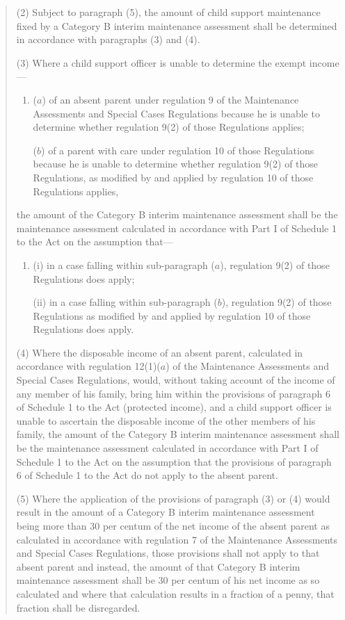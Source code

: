 \documentclass[12pt,a4paper]{article}
\begin{document}
\begin{quotation}
(2) Subject to paragraph (5), the amount of child support maintenance fixed by a Category B interim maintenance assessment shall be determined in accordance with paragraphs (3) and (4).

(3) Where a child support officer is unable to determine the exempt income—
\begin{enumerate}\item[]
($a$) of an absent parent under regulation 9 of the Maintenance Assessments and Special Cases Regulations because he is unable to determine whether regulation 9(2) of those Regulations applies;

($b$) of a parent with care under regulation 10 of those Regulations because he is unable to determine whether regulation 9(2) of those Regulations, as modified by and applied by regulation 10 of those Regulations applies,
\end{enumerate}
the amount of the Category B interim maintenance assessment shall be the maintenance assessment calculated in accordance with Part I of Schedule 1 to the Act on the assumption that—
\begin{enumerate}\item[]
(i) in a case falling within sub-paragraph ($a$), regulation 9(2) of those Regulations does apply;

(ii) in a case falling within sub-paragraph ($b$), regulation 9(2) of those Regulations as modified by and applied by regulation 10 of those Regulations does apply.
\end{enumerate}

(4) Where the disposable income of an absent parent, calculated in accordance with regulation 12(1)($a$) of the Maintenance Assessments and Special Cases Regulations, would, without taking account of the income of any member of his family, bring him within the provisions of paragraph 6 of Schedule 1 to the Act (protected income), and a child support officer is unable to ascertain the disposable income of the other members of his family, the amount of the Category B interim maintenance assessment shall be the maintenance assessment calculated in accordance with Part I of Schedule 1 to the Act on the assumption that the provisions of paragraph 6 of Schedule 1 to the Act do not apply to the absent parent.

(5) Where the application of the provisions of paragraph (3) or (4) would result in the amount of a Category B interim maintenance assessment being more than 30 per centum of the net income of the absent parent as calculated in accordance with regulation 7 of the Maintenance Assessments and Special Cases Regulations, those provisions shall not apply to that absent parent and instead, the amount of that Category B interim maintenance assessment shall be 30 per centum of his net income as so calculated and where that calculation results in a fraction of a penny, that fraction shall be disregarded.


\end{quotation}
\end{document}
